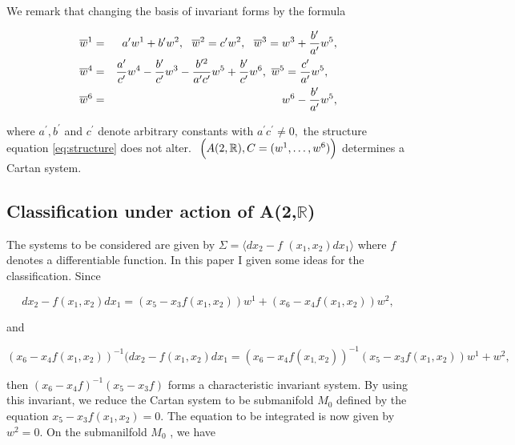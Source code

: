 \documentclass{amsproc}
\theoremstyle{remark}
\numberwithin{equation}{section}
\begin{document}
We remark that changing the basis of invariant forms by the formula

\begin{eqnarray}
\overline{w}^{1} &=&a^{\prime }w^{1}+b^{\prime }w^{2},\text{ \ }\overline{w}^{2}=c^{\prime }w^{2},\text{ \ }\overline{w}^{3}=w^{3}+\frac{b^{\prime }}{a^{\prime }}w^{5}, \notag \\
\overline{w}^{4} &=&\frac{a^{\prime }}{c^{\prime }}w^{4}-\frac{b^{\prime }}{c^{\prime }}w^{3}-\frac{b^{\prime 2}}{a^{\prime }c^{\prime }}w^{5}+\frac{b^{\prime }}{c^{\prime }}w^{6},\text{ }\overline{w}^{5}=\frac{c^{\prime }}{a^{\prime }}w^{5},
 \label{eq:4.2}
  \text{\ \ } \\
\overline{w}^{6} &=&w^{6}-\frac{b^{\prime }}{a^{\prime }}w^{5}, \notag
\end{eqnarray}

where $a^{\prime },b^{\prime }$ and $c^{\prime }$ denote arbitrary constants
with $a^{\prime }c^{\prime }\neq 0,$ the structure equation \eqref{eq:structure} does not
alter. $\ {\Bigl (}A(2,\mathbb{R}
),C=(w^{1},\ldots ,w^{6}){\Bigr )}$ determines a Cartan system.

\subsection{Classification under action of A(2,$\mathbb{R}
$)}

The systems to be considered are given by $\Sigma =\langle dx_{2}-f$ $(x_{1},x_{2})dx_{1}\rangle $ where $f$ denotes a differentiable function. In
this paper I given some ideas for the classification. Since

\begin{equation*}
dx_{2}-f(x_{1},x_{2})dx_{1}=(x_{5}-x_{3}f(x_{1},x_{2}))w^{1}+(x_{6}-x_{4}f(x_{1},x_{2}))w^{2},
\end{equation*}

and

\begin{equation*}
(x_{6}-x_{4}f(x_{1},x_{2}))^{-1}(dx_{2}-f(x_{1},x_{2})dx_{1}=(x_{6}-x_{4}f(x_{1,}x_{2}))^{-1}(x_{5}-x_{3}f(x_{1},x_{2}))w^{1}+w^{2},
\end{equation*}

then $(x_{6}-x_{4}f)^{-1}(x_{5}-x_{3}f)$ forms a characteristic invariant
system. By using this invariant, we reduce the Cartan system to be
submanifold $M_{0}$ defined by the equation $x_{5}-x_{3}f(x_{1},x_{2})=0.$
The equation to be integrated is now given by $w^{2}=0.$ On the submanilfold 
$M_{0}$ , we have
\end{document}
